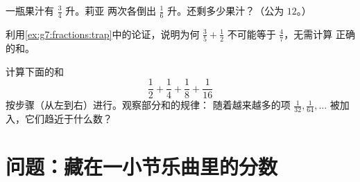 \begin{exercise}[$\star\star$]\label{exo:g7:fractions:10}
一瓶果汁有 $\frac34$ 升。莉亚
两次各倒出 $\frac16$ 升。还剩多少果汁？（公为 $12$。）
\end{exercise}

\begin{exercise}[$\star\star$]\label{exo:g7:fractions:11}
利用\cref{ex:g7:fractions:trap}中的论证，说明为何
$\frac35 + \frac12$ 不可能等于 $\frac{4}{7}$，无需计算
正确的和。
\end{exercise}

\begin{exercise}[$\star\star\star$]\label{exo:g7:fractions:12}
计算下面的和
\[
\frac12 + \frac14 + \frac18 + \frac{1}{16}
\]
按步骤（从左到右）进行。观察部分和的规律：
随着越来越多的项
$\frac{1}{32}, \frac{1}{64}, \dots$ 被加入，它们趋近于什么数？
\end{exercise}

\section{问题：藏在一小节乐曲里的分数}

